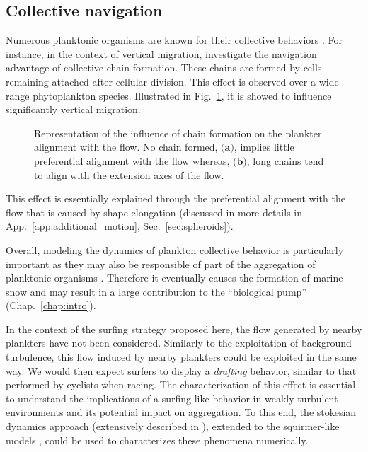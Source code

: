 \subsection{Collective navigation}

Numerous planktonic organisms are known for their collective behaviors \citep{mukherjee2019photosensing, tsang2014flagella}.
For instance, in the context of vertical migration, \citet{lovecchio2019chain} investigate the navigation advantage of collective chain formation.
These chains are formed by cells remaining attached after cellular division.
This effect is observed over a wide range phytoplankton species.
Illustrated in Fig.~\ref{fig:chain_formation}, it is showed to influence significantly vertical migration.
\begin{figure}
    \centering
    \def\svgwidth{0.6\textwidth}
    
    \caption[Representation of the influence of chain formation on the plankter alignment with the flow.]{
    	Representation of the influence of chain formation on the plankter alignment with the flow.
    	No chain formed, $\textbf{(a)}$, implies little preferential alignment with the flow whereas, $\textbf{(b)}$, long chains tend to align with the extension axes of the flow.
    }
    \label{fig:chain_formation}
\end{figure}
This effect is essentially explained through the preferential alignment with the flow that is caused by shape elongation (discussed in more details in App.~\ref{app:additional_motion}, Sec.~\ref{sec:spheroids}).

Overall, modeling the dynamics of plankton collective behavior is particularly important as they may also be responsible of part of the aggregation of planktonic organisms \citep{falgueras2022aggregated}.
Therefore it eventually causes the formation of marine snow and may result in a large contribution to the ``biological pump'' (Chap.~\ref{chap:intro}).

In the context of the surfing strategy proposed here, the flow generated by nearby plankters have not been considered.
Similarly to the exploitation of background turbulence, this flow induced by nearby plankters could be exploited in the same way.
We would then expect surfers to display a \textit{drafting} behavior, similar to that performed by cyclists when racing.
The characterization of this effect is essential to understand the implications of a surfing-like behavior in weakly turbulent environments and its potential impact on aggregation.
To this end, the stokesian dynamics approach (extensively described in \citep{townsend2017mechanics}), extended to the squirmer-like models \citep{ito2019swimming}, could be used to characterizes these phenomena numerically.

